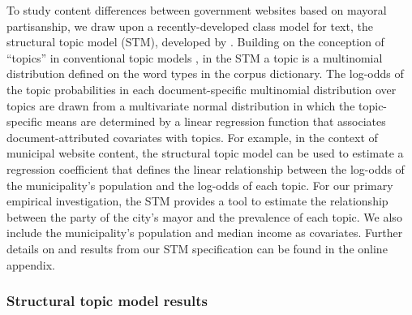 \documentclass[11pt]{article}
\begin{document}
%

To study content differences between government websites based on mayoral partisanship, we draw upon a recently-developed class model for text, the structural topic model (STM), developed by \citet{Roberts2014}. Building on the conception of ``topics'' in conventional topic models \citep{valdez2018topic}, in the STM a topic is a multinomial distribution defined on the word types in the corpus dictionary. The log-odds of the topic probabilities in each document-specific multinomial distribution over topics are drawn from a multivariate normal distribution in which the topic-specific means are determined by a linear regression function that associates document-attributed covariates with topics. For example, in the context of municipal website content, the structural topic model can be used to estimate a regression coefficient that defines the linear relationship between the log-odds of the municipality's population and the log-odds of each topic. For our primary empirical investigation, the STM provides a tool to estimate the relationship between the party of the city's mayor and the prevalence of each topic. We also include the municipality's population and median income as covariates. Further details on and results from our STM specification can be found in the online appendix.


\subsubsection{Structural topic model results}
\end{document}
